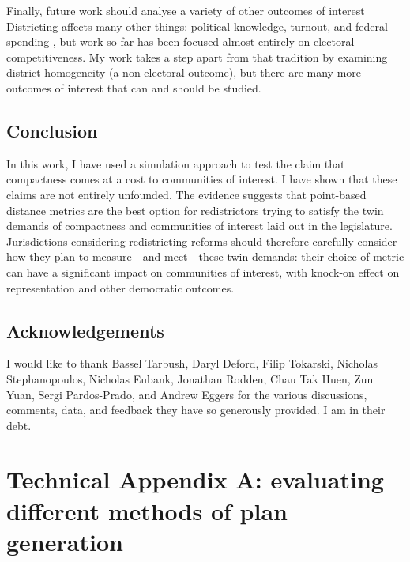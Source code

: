\documentclass[]{article}
\begin{document}
Finally, future work should analyse a variety of other outcomes of
interest Districting affects many other things: political knowledge,
turnout, and federal spending \citep{snyder2010}, but work so far has
been focused almost entirely on electoral competitiveness. My work takes
a step apart from that tradition by examining district homogeneity (a
non-electoral outcome), but there are many more outcomes of interest
that can and should be studied.

\hypertarget{conclusion}{%
\subsection{Conclusion}\label{conclusion}}

In this work, I have used a simulation approach to test the claim that
compactness comes at a cost to communities of interest. I have shown
that these claims are not entirely unfounded. The evidence suggests that
point-based distance metrics are the best option for redistrictors
trying to satisfy the twin demands of compactness and communities of
interest laid out in the legislature. Jurisdictions considering
redistricting reforms should therefore carefully consider how they plan
to measure---and meet---these twin demands: their choice of metric can
have a significant impact on communities of interest, with knock-on
effect on representation and other democratic outcomes.

\hypertarget{acknowledgements}{%
\subsection{Acknowledgements}\label{acknowledgements}}

I would like to thank Bassel Tarbush, Daryl Deford, Filip Tokarski,
Nicholas Stephanopoulos, Nicholas Eubank, Jonathan Rodden, Chau Tak
Huen, Zun Yuan, Sergi Pardos-Prado, and Andrew Eggers for the various
discussions, comments, data, and feedback they have so generously
provided. I am in their debt.

\pagebreak{}

\hypertarget{technical-appendix-a-evaluating-different-methods-of-plan-generation}{%
\section{Technical Appendix A: evaluating different methods of plan
generation}\label{technical-appendix-a-evaluating-different-methods-of-plan-generation}}
\end{document}

